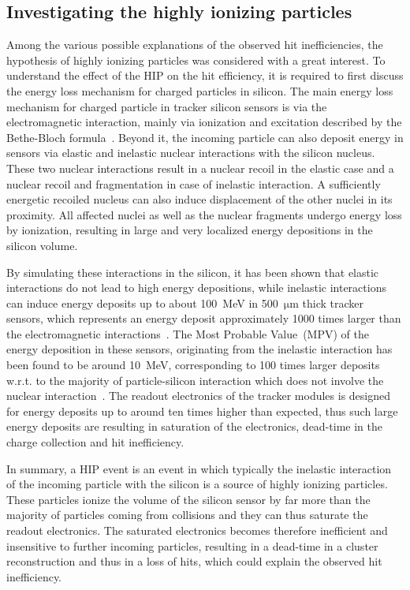 

\subsection{Investigating the highly ionizing particles}

Among the various possible explanations of the observed hit inefficiencies, the hypothesis of highly ionizing particles was considered with a great interest. To understand the effect of the HIP on the hit efficiency, it is required to first discuss the energy loss mechanism for charged particles in silicon. The main energy loss mechanism for charged particle in tracker silicon sensors is via the electromagnetic interaction, mainly via ionization and excitation described by the Bethe-Bloch formula~\cite{Groom:2000sm}. Beyond it, the incoming particle can also deposit energy in sensors via elastic and inelastic nuclear interactions with the silicon nucleus. These two nuclear interactions result in a nuclear recoil in the elastic case and a nuclear recoil and fragmentation in case of inelastic interaction. A sufficiently energetic recoiled nucleus can also induce displacement of the other nuclei in its proximity. All affected nuclei as well as the nuclear fragments undergo energy loss by ionization, resulting in large and very localized energy depositions in the silicon volume. 

By simulating these interactions in the silicon, it has been shown that elastic interactions do not lead to high energy depositions, while inelastic interactions can induce energy deposits up to about 100~MeV in 500~$\mathrm{\mu m}$ thick tracker sensors, which represents an energy deposit approximately 1000 times larger than the electromagnetic interactions~\cite{Huhtinen:2002yda}. The Most Probable Value~(MPV) of the energy deposition in these sensors, originating from the inelastic interaction has been found to be around 10~MeV, corresponding to 100 times larger deposits w.r.t. to the majority of particle-silicon interaction which does not involve the nuclear interaction~\cite{Adam:2005pz}. The readout electronics of the tracker modules is designed for energy deposits up to around ten times higher than expected, thus such large energy deposits are resulting in saturation of the electronics, dead-time in the charge collection and hit inefficiency. 

In summary, a HIP event is an event in which typically the inelastic interaction of the incoming particle with the silicon is a source of highly ionizing particles. These particles ionize the volume of the silicon sensor by far more than the majority of particles coming from collisions and they can thus saturate the readout electronics. The saturated electronics becomes therefore inefficient and insensitive to further incoming particles, resulting in a dead-time in a cluster reconstruction and thus in a loss of hits, which could explain the observed hit inefficiency.

